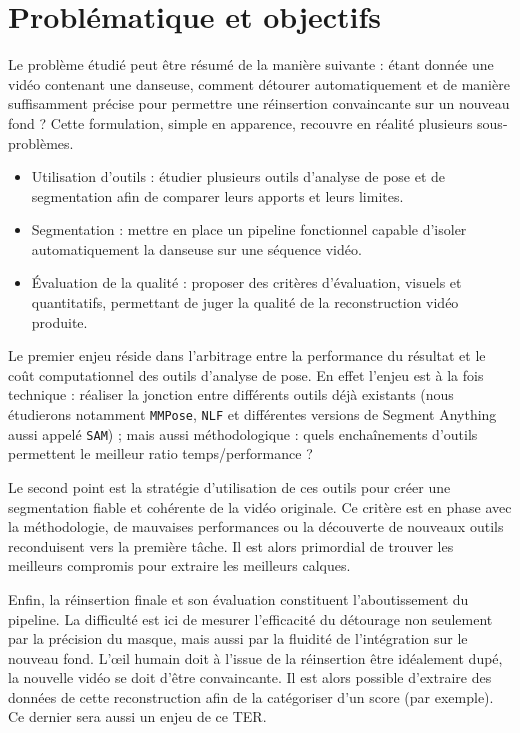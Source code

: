 \documentclass[11pt,a4paper]{article}
\begin{document}
\section{Problématique et objectifs}
Le problème étudié peut être résumé de la manière suivante : étant donnée une vidéo contenant une danseuse, comment détourer automatiquement et de manière suffisamment précise pour permettre une réinsertion convaincante sur un nouveau fond ?
Cette formulation, simple en apparence, recouvre en réalité plusieurs sous-problèmes.

\begin{itemize}
    \item Utilisation d'outils : étudier plusieurs outils d'analyse de pose et de segmentation afin de comparer leurs apports et leurs limites.
    \item Segmentation : mettre en place un pipeline fonctionnel capable d'isoler automatiquement la danseuse sur une séquence vidéo.
    \item Évaluation de la qualité : proposer des critères d'évaluation, visuels et quantitatifs, permettant de juger la qualité de la reconstruction vidéo produite.
\end{itemize}

Le premier enjeu réside dans l'arbitrage entre la performance du résultat et le coût computationnel des outils d'analyse de pose.
En effet l'enjeu est à la fois technique : réaliser la jonction entre différents outils déjà existants (nous étudierons notamment \texttt{MMPose}, \texttt{NLF} et différentes versions de Segment Anything aussi appelé \texttt{SAM}) ; mais aussi méthodologique : quels enchaînements d'outils permettent le meilleur ratio temps/performance ?

Le second point est la stratégie d'utilisation de ces outils pour créer une segmentation fiable et cohérente de la vidéo originale. Ce critère est en phase avec la méthodologie, de mauvaises performances ou la découverte de nouveaux outils reconduisent vers la première tâche.
Il est alors primordial de trouver les meilleurs compromis pour extraire les meilleurs calques.

Enfin, la réinsertion finale et son évaluation constituent l'aboutissement du pipeline. La difficulté est ici de mesurer l'efficacité du détourage non seulement par la précision du masque, mais aussi par la fluidité de l'intégration sur le nouveau fond.
L'œil humain doit à l'issue de la réinsertion être idéalement dupé, la nouvelle vidéo se doit d'être convaincante.
Il est alors possible d'extraire des données de cette reconstruction afin de la catégoriser d'un score (par exemple). Ce dernier sera aussi un enjeu de ce TER. 
\end{document}
